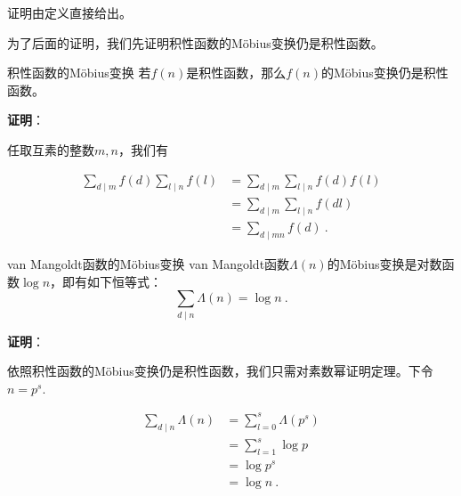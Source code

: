 证明由定义直接给出。

为了后面的证明，我们先证明积性函数的Möbius变换仍是积性函数。

\begin{theorem}{积性函数的Möbius变换}
若$f(n)$是积性函数，那么$f(n)$的Möbius变换仍是积性函数。
\end{theorem}

\textbf{证明}：

任取互素的整数$m,n$，我们有

\begin{equation}
\begin{aligned}
\sum_{d\mid m}f(d)\sum_{l\mid n}f(l)&=\sum_{d\mid m}\sum_{l\mid n}f(d)f(l)\\
&=\sum_{d\mid m}\sum_{l\mid n}f(dl)\\
&=\sum_{d\mid mn}f(d)~.
\end{aligned}
\end{equation}

\begin{theorem}{van Mangoldt函数的Möbius变换}
van Mangoldt函数$\Lambda(n)$的Möbius变换是对数函数$\log n$，即有如下恒等式：
\begin{equation}
\sum_{d\mid n}\Lambda(n)=\log{n}~.
\end{equation}
\end{theorem}

\textbf{证明}：

依照积性函数的Möbius变换仍是积性函数，我们只需对素数幂证明定理。下令$n=p^s$.

\begin{equation}
\begin{aligned}
\sum_{d\mid n}\Lambda(n)&=\sum_{l=0}^s \Lambda(p^s)\\
&=\sum_{l=1}^s \log p\\
&=\log p^s\\
&=\log n~.
\end{aligned}
\end{equation}


